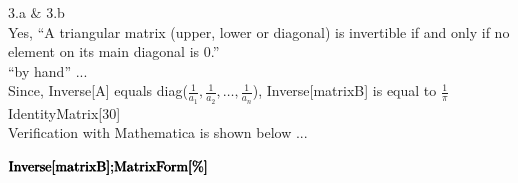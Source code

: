 \documentclass[11pt,a4paper]{article}
\begin{document}
3.a $\&$ 3.b\\
Yes, {``}A triangular matrix (upper, lower or diagonal) is invertible if and only if no element on its main diagonal is 0.{''}\\

{``}by hand{''} ...\\
Since, Inverse[A] equals diag($\frac{1}{a_1},\frac{1}{a_2},\ldots ,\frac{1}{a_n}$), Inverse[matrixB] is equal to $\frac{1}{\pi }$IdentityMatrix[30]\\

Verification with Mathematica is shown below ...

\begin{doublespace}
\noindent\(\pmb{\text{Inverse}[\text{matrixB}];}\\
\pmb{\text{MatrixForm}[\%]}\)
\end{doublespace}
\end{document}
